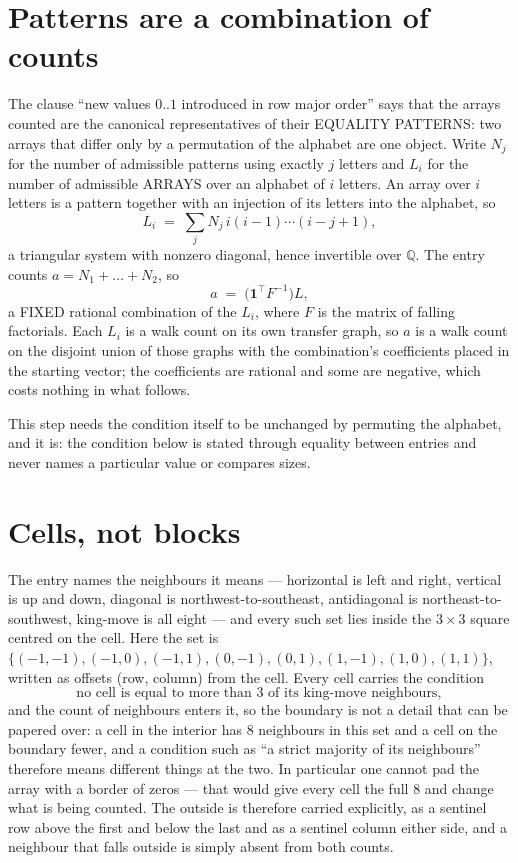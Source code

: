 \documentclass[11pt,a4paper]{article}
\theoremstyle{plain}
\theoremstyle{definition}
\begin{document}
\section{Patterns are a combination of counts}

The clause ``new values $0..1$ introduced in row major order'' says that the arrays
counted are the canonical representatives of their EQUALITY PATTERNS: two arrays that differ
only by a permutation of the alphabet are one object. Write $N_j$ for the number of admissible
patterns using exactly $j$ letters and $L_i$ for the number of admissible ARRAYS over an
alphabet of $i$ letters. An array over $i$ letters is a pattern together with an injection of
its letters into the alphabet, so
\[
L_i\;=\;\sum_{j}N_j\,i(i-1)\cdots(i-j+1),
\]
a triangular system with nonzero diagonal, hence invertible over $\mathbb{Q}$. The entry
counts $a=N_1+\dots+N_{2}$, so
\[
a\;=\;\bigl(\mathbf{1}^{\!\top}F^{-1}\bigr)L ,
\]
a FIXED rational combination of the $L_i$, where $F$ is the matrix of falling factorials.
Each $L_i$ is a walk count on its own transfer graph, so $a$ is a walk count on the disjoint
union of those graphs with the combination's coefficients placed in the starting vector; the
coefficients are rational and some are negative, which costs nothing in what follows.

This step needs the condition itself to be unchanged by permuting the alphabet, and it is:
the condition below is stated through equality between entries and never names a particular
value or compares sizes.

\section{Cells, not blocks}

The entry names the neighbours it means --- horizontal is left and right, vertical is up and
down, diagonal is northwest-to-southeast, antidiagonal is northeast-to-southwest, king-move is
all eight --- and every such set lies inside the $3\times3$ square centred on the cell. Here
the set is $\{(-1,-1), (-1,0), (-1,1), (0,-1), (0,1), (1,-1), (1,0), (1,1)\}$, written as offsets (row, column) from the cell. Every cell carries
the condition
\[
\text{no cell is equal to more than 3 of its king-move neighbours},
\]
and the count of neighbours enters it, so the boundary is not a detail that can be papered
over: a cell in the interior has $8$ neighbours in this set and a cell on the boundary
fewer, and a condition such as ``a strict majority of its neighbours'' therefore means
different things at the two. In particular one cannot pad the array with a border of zeros ---
that would give every cell the full $8$ and change what is being counted. The outside is
therefore carried
explicitly, as a sentinel row above the first and below the last and as a sentinel column
either side, and a neighbour that falls outside is simply absent from both counts.
\end{document}
